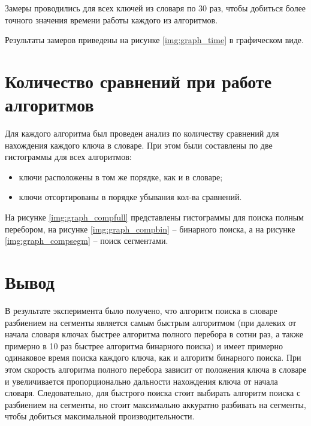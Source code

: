 Замеры проводились для всех ключей из словаря по 30 раз, чтобы добиться более точного значения времени работы каждого из алгоритмов.

Результаты замеров приведены на рисунке \ref{img:graph_time} в графическом виде.


\clearpage

\section{Количество сравнений при работе алгоритмов}

Для каждого алгоритма был проведен анализ по количеству сравнений для нахождения каждого ключа в словаре. При этом были составлены по две гистограммы для всех алгоритмов: 
\begin{itemize}
    \item ключи расположены в том же порядке, как и в словаре;
    \item ключи отсортированы в порядке убывания кол-ва сравнений. 
\end{itemize}

На рисунке \ref{img:graph_compfull} представлены гистограммы для поиска полным перебором, на рисунке \ref{img:graph_compbin} -- бинарного поиска, а на рисунке \ref{img:graph_compsegm} -- поиск сегментами.


\clearpage


\section{Вывод}

В результате эксперимента было получено, что алгоритм поиска в словаре разбиением на сегменты является самым быстрым алгоритмом (при далеких от начала словаря ключах быстрее алгоритма полного перебора в сотни раз, а также примерно в 10 раз быстрее алгоритма бинарного поиска) и имеет примерно одинаковое время поиска каждого ключа, как и алгоритм бинарного поиска. При этом скорость алгоритма полного перебора зависит от положения ключа в словаре и увеличивается пропорционально дальности нахождения ключа от начала словаря. Следовательно, для быстрого поиска стоит выбирать алгоритм поиска с разбиением на сегменты, но стоит максимально аккуратно разбивать на сегменты, чтобы добиться максимальной производительности.

